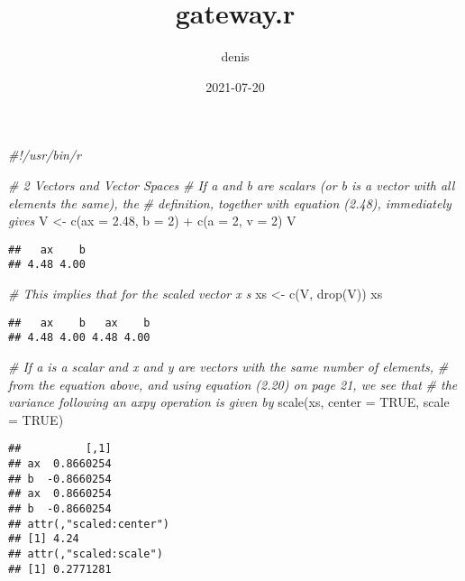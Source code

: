 \documentclass[
]{article}
\title{gateway.r}
\author{denis}
\date{2021-07-20}
\newenvironment{Shaded}{\begin{snugshade}}{\end{snugshade}}
\newcommand{\AttributeTok}[1]{\textcolor[rgb]{0.77,0.63,0.00}{#1}}
\newcommand{\CommentTok}[1]{\textcolor[rgb]{0.56,0.35,0.01}{\textit{#1}}}
\newcommand{\ConstantTok}[1]{\textcolor[rgb]{0.00,0.00,0.00}{#1}}
\newcommand{\DecValTok}[1]{\textcolor[rgb]{0.00,0.00,0.81}{#1}}
\newcommand{\FloatTok}[1]{\textcolor[rgb]{0.00,0.00,0.81}{#1}}
\newcommand{\FunctionTok}[1]{\textcolor[rgb]{0.00,0.00,0.00}{#1}}
\newcommand{\NormalTok}[1]{#1}
\newcommand{\OtherTok}[1]{\textcolor[rgb]{0.56,0.35,0.01}{#1}}
\newcommand{\SpecialCharTok}[1]{\textcolor[rgb]{0.00,0.00,0.00}{#1}}
\begin{document}
\maketitle

\begin{Shaded}
\begin{Highlighting}[]
\CommentTok{\#!/usr/bin/r}

\CommentTok{\# 2 Vectors and Vector Spaces}
\CommentTok{\# If a and b are scalars (or b is a vector with all elements the same), the}
\CommentTok{\# definition, together with equation (2.48), immediately gives}
\NormalTok{V }\OtherTok{\textless{}{-}} \FunctionTok{c}\NormalTok{(}\AttributeTok{ax =} \FloatTok{2.48}\NormalTok{, }\AttributeTok{b =} \DecValTok{2}\NormalTok{) }\SpecialCharTok{+} \FunctionTok{c}\NormalTok{(}\AttributeTok{a =} \DecValTok{2}\NormalTok{, }\AttributeTok{v =} \DecValTok{2}\NormalTok{)}
\NormalTok{V}
\end{Highlighting}
\end{Shaded}

\begin{verbatim}
##   ax    b 
## 4.48 4.00
\end{verbatim}

\begin{Shaded}
\begin{Highlighting}[]
\CommentTok{\# This implies that for the scaled vector x s}
\NormalTok{xs }\OtherTok{\textless{}{-}} \FunctionTok{c}\NormalTok{(V, }\FunctionTok{drop}\NormalTok{(V))}
\NormalTok{xs}
\end{Highlighting}
\end{Shaded}

\begin{verbatim}
##   ax    b   ax    b 
## 4.48 4.00 4.48 4.00
\end{verbatim}

\begin{Shaded}
\begin{Highlighting}[]
\CommentTok{\# If a is a scalar and x and y are vectors with the same number of elements,}
\CommentTok{\# from the equation above, and using equation (2.20) on page 21, we see that}
\CommentTok{\# the variance following an axpy operation is given by}
\FunctionTok{scale}\NormalTok{(xs, }\AttributeTok{center =} \ConstantTok{TRUE}\NormalTok{, }\AttributeTok{scale =} \ConstantTok{TRUE}\NormalTok{)}
\end{Highlighting}
\end{Shaded}

\begin{verbatim}
##          [,1]
## ax  0.8660254
## b  -0.8660254
## ax  0.8660254
## b  -0.8660254
## attr(,"scaled:center")
## [1] 4.24
## attr(,"scaled:scale")
## [1] 0.2771281
\end{verbatim}
\end{document}
